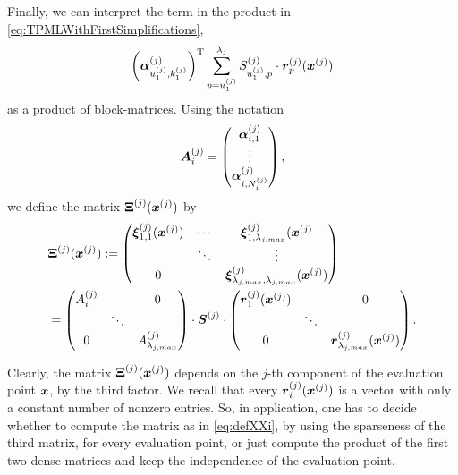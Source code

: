 \documentclass[	a4paper, 
								11pt]{article}
\theoremstyle{plain}
\begin{document}
Finally, we can interpret the term in the product in \eqref{eq:TPMLWithFirstSimplifications},
\begin{align*}
    \left(\boldsymbol{\alpha}^{(j)}_
 {u_1^{(j)},k_1^{(j)}}\right)^{\text{T}}
 \sum_{p = u_1^{(j)}}^{\lambda_j}S^{(j)}_{u_1^{(j)}, p} \cdot \boldsymbol{r}^{(j)}_{p}
  (\boldsymbol{x}^{(j)})
\end{align*}
as a product of block-matrices. Using the notation 
\begin{align*}
    \boldsymbol{A}^{(j)}_i = \begin{pmatrix} \boldsymbol{\alpha}^{(j)}_{i,1} \\ \vdots \\ \boldsymbol{\alpha}^{(j)}_{i,N_i^{(j)}} \end{pmatrix},
\end{align*}
we define the matrix $ \boldsymbol{\Xi}^{(j)}(\boldsymbol{x}^{(j)}) $ by
\begin{align}\label{eq:defXXi}
    &\boldsymbol{\Xi}^{(j)}(\boldsymbol{x}^{(j)}) := 
    \begin{pmatrix}
        \boldsymbol{\xi}^{(j)}_{1,1}(\boldsymbol{x}^{(j)}) & \cdots & \boldsymbol{\xi}^{(j)}_{1, \lambda_{j,max}}(\boldsymbol{x}^{(j)} \\
        & \ddots & \vdots \\
        0 & & \boldsymbol{\xi}^{(j)}_{\lambda_{j,max}, \lambda_{j,max}}(\boldsymbol{x}^{(j)})
    \end{pmatrix} \nonumber \\
    &= \begin{pmatrix} 
    A^{(j)}_i &        & 0 \\
              & \ddots &   \\
    0         &        & A^{(j)}_{\lambda_{j,max}}
    \end{pmatrix}
    \cdot \boldsymbol{S}^{(j)}
    \cdot
    \begin{pmatrix}
        \boldsymbol{r}^{(j)}_{1} (\boldsymbol{x}^{(j)})&         & 0 \\
                      & \ddots  &   \\
                    0 &         & \boldsymbol{r}^{(j)}_{\lambda_{j,max}}(\boldsymbol{x}^{(j)})
    \end{pmatrix}.
\end{align}

Clearly, the matrix $ \boldsymbol{\Xi}^{(j)}(\boldsymbol{x}^{(j)}) $ depends on the $ j $-th component of the evaluation point $ \boldsymbol{x} $, by the third factor. We recall that every $ \boldsymbol{r}^{(j)}_i(\boldsymbol{x}^{(j)}) $ is a vector with only a constant number of nonzero entries. So, in application, one has to decide whether to compute the matrix as in \eqref{eq:defXXi}, by using the sparseness of the third matrix, for every evaluation point, or just compute the product of the first two dense matrices and keep the independence of the evaluation point.
\end{document}

